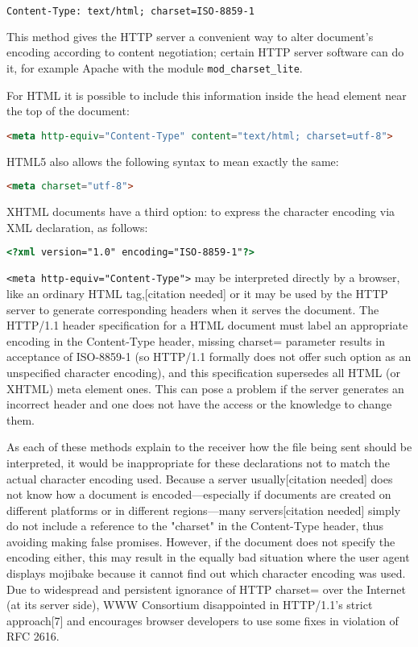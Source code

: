 \begin{lstlisting}[language=HTML]
Content-Type: text/html; charset=ISO-8859-1
\end{lstlisting}

This method gives the HTTP server a convenient way to alter document's encoding according to content negotiation; certain HTTP server software can do it, for example Apache with the module \texttt{mod\_charset\_lite}.

For HTML it is possible to include this information inside the head element near the top of the document:

\begin{lstlisting}[language=HTML]
<meta http-equiv="Content-Type" content="text/html; charset=utf-8">
\end{lstlisting}

HTML5 also allows the following syntax to mean exactly the same:

\begin{lstlisting}[language=HTML]
<meta charset="utf-8">
\end{lstlisting}

XHTML documents have a third option: to express the character encoding via XML declaration, as follows:

\begin{lstlisting}[language=HTML]
<?xml version="1.0" encoding="ISO-8859-1"?>
\end{lstlisting}

\texttt{<meta http-equiv="Content-Type">} may be interpreted directly by a browser, like an ordinary HTML tag,[citation needed] or it may be used by the HTTP server to generate corresponding headers when it serves the document. The HTTP/1.1 header specification for a HTML document must label an appropriate encoding in the Content-Type header, missing charset= parameter results in acceptance of ISO-8859-1 (so HTTP/1.1 formally does not offer such option as an unspecified character encoding), and this specification supersedes all HTML (or XHTML) meta element ones. This can pose a problem if the server generates an incorrect header and one does not have the access or the knowledge to change them.

As each of these methods explain to the receiver how the file being sent should be interpreted, it would be inappropriate for these declarations not to match the actual character encoding used. Because a server usually[citation needed] does not know how a document is encoded—especially if documents are created on different platforms or in different regions—many servers[citation needed] simply do not include a reference to the "charset" in the Content-Type header, thus avoiding making false promises. However, if the document does not specify the encoding either, this may result in the equally bad situation where the user agent displays mojibake because it cannot find out which character encoding was used. Due to widespread and persistent ignorance of HTTP charset= over the Internet (at its server side), WWW Consortium disappointed in HTTP/1.1’s strict approach[7] and encourages browser developers to use some fixes in violation of RFC 2616.

